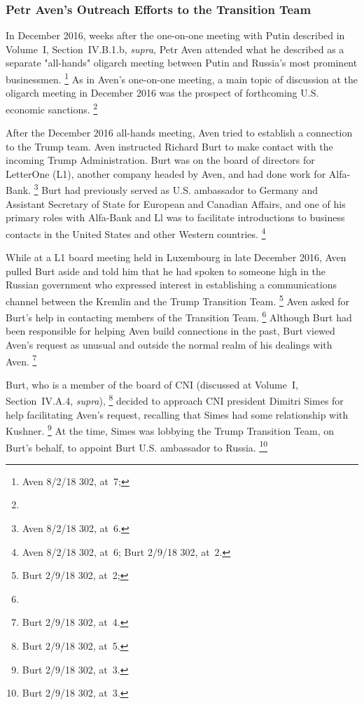 \subsubsection{Petr Aven's Outreach Efforts to the Transition Team}

In December 2016, weeks after the one-on-one meeting with Putin described in Volume~I, Section~IV.B.1.b, \textit{supra}, Petr Aven attended what he described as a separate "all-hands" oligarch meeting between Putin and Russia's most prominent businessmen.%
\footnote{Aven 8/2/18 302, at~7; }
As in Aven's one-on-one meeting, a main topic of discussion at the oligarch meeting in December 2016 was the prospect of forthcoming U.S. economic sanctions.%
\footnote{}

After the December 2016 all-hands meeting, Aven tried to establish a connection to the Trump team.
Aven instructed Richard Burt to make contact with the incoming Trump Administration.
Burt was on the board of directors for LetterOne (L1), another company headed by Aven, and had done work for Alfa-Bank.%
\footnote{ Aven 8/2/18 302, at~6.}
Burt had previously served as U.S. ambassador to Germany and Assistant Secretary of State for European and Canadian Affairs, and one of his primary roles with Alfa-Bank and Ll was to facilitate introductions to business contacts in the United States and other Western countries.%
\footnote{ Aven 8/2/18 302, at~6;
Burt 2/9/18 302, at~2.}

While at a L1 board meeting held in Luxembourg in late December 2016, Aven pulled Burt aside and told him that he had spoken to someone high in the Russian government who expressed interest in establishing a communications channel between the Kremlin and the Trump Transition Team.%
\footnote{Burt 2/9/18 302, at~2; }
Aven asked for Burt's help in contacting members of the Transition Team.%
\footnote{}
Although Burt had been responsible for helping Aven build connections in the past, Burt viewed Aven's request as unusual and outside the normal realm of his dealings with Aven.%
\footnote{Burt 2/9/18 302, at~4.}

Burt, who is a member of the board of CNI (discussed at Volume~I, Section~IV.A.4, \textit{supra}),%
\footnote{Burt 2/9/18 302, at~5.}
decided to approach CNI president Dimitri Simes for help facilitating Aven's request, recalling that Simes had some relationship with Kushner.%
\footnote{Burt 2/9/18 302, at~3.}
At the time, Simes was lobbying the Trump Transition Team, on Burt's behalf, to appoint Burt U.S. ambassador to Russia.%
\footnote{Burt 2/9/18 302, at~3.}

